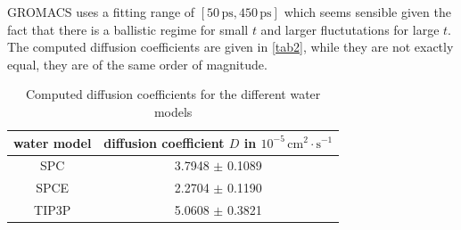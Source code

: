 \documentclass[a4paper,10pt,bibtotoc]{scrartcl}
\begin{document}
\noindent GROMACS uses a fitting range of $\left[50\,\mathrm{ps},450\,\mathrm{ps}\right]$ which seems sensible given the fact that there is a ballistic regime for small $t$ and larger fluctutations for large $t$. 
The computed diffusion coefficients are given in \autoref{tab2}, while they are not exactly equal, they are of the same order of magnitude. 

\begin{table}[h]
\centering
\caption{Computed diffusion coefficients for the different water models}
\begin{tabular}{@{}cc@{}}
\toprule
water model & diffusion coefficient $D$ in $10^{-5}\,\mathrm{cm}^2\cdot \mathrm{s}^{-1}$ \\ \midrule
SPC         &          3.7948 $\pm$ 0.1089                 \\
SPCE        &          2.2704 $\pm$ 0.1190            \\
TIP3P       &          5.0608 $\pm$       0.3821    \\ \bottomrule
\end{tabular}
\label{tab2}
\end{table}
\end{document}
